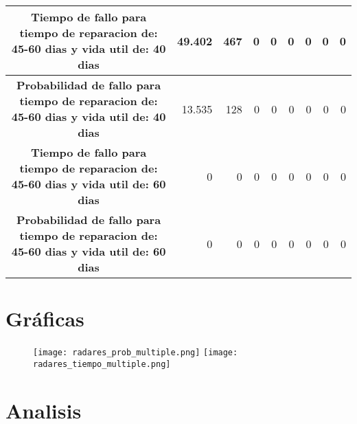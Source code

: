 \begin{table}[h]
{\begin{tabular}{|c|rrrrrrrr|}
\textbf{Tiempo de fallo para tiempo de reparacion de: 45-60 dias y vida util de: 40 dias}       & 49.402     & 467       & 0         & 0         & 0         & 0         & 0       & 0       \\ \hline
\textbf{Probabilidad de fallo para tiempo de reparacion de: 45-60 dias y vida util de: 40 dias} & 13.535     & 128       & 0         & 0         & 0         & 0         & 0       & 0       \\ \hline
\textbf{Tiempo de fallo para tiempo de reparacion de: 45-60 dias y vida util de: 60 dias}       & 0          & 0         & 0         & 0         & 0         & 0         & 0       & 0       \\ \hline
\textbf{Probabilidad de fallo para tiempo de reparacion de: 45-60 dias y vida util de: 60 dias} & 0          & 0         & 0         & 0         & 0         & 0         & 0       & 0       \\ \hline
\end{tabular}%
}
\end{table}

\section{Gráficas}

\begin{figure}[h]
\texttt{[image: radares\_prob\_multiple.png]}
\texttt{[image: radares\_tiempo\_multiple.png]}
\centering
\end{figure}

\section{Analisis}
